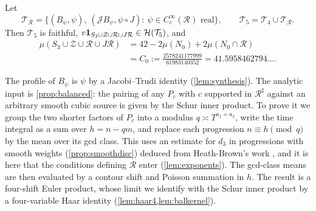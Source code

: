 \documentclass[11pt,colorlinks]{charlie}
\begin{document}
\begin{theorem}\label{thm:row}
Let
\[
 \mathcal T_{\mathcal R}=\big\{(B_\psi,\psi),\ (\mathcal JB_\psi,\psi\circ J):\ \psi\in C_c^\infty(\mathcal R)\text{ real}\big\},\qquad\mathcal T_5=\mathcal T_4\cup\mathcal T_{\mathcal R}.
\]
Then $\mathcal T_5$ is faithful, $v\mathbf{1}_{S_3\cup\mathcal Z\cup\mathcal R\cup J\mathcal R}\in\mathcal H(\mathcal T_5)$, and
\begin{align*}
 \mu(S_3\cup\mathcal Z\cup\mathcal R\cup J\mathcal R)&=42-2\mu(N_0)+2\mu(N_0\cap\mathcal R)\\
 &=C_0:=\frac{2578241177999}{61983140352}=41.5958462794\ldots .
\end{align*}
\end{theorem}

The profile of $B_\psi$ is $\psi$ by a Jacobi--Trudi identity (\cref{lem:synthesis}). The analytic input is \cref{prop:balanced}: the pairing of any $P_c$ with $c$ supported in $\mathcal R^\sharp$ against an arbitrary smooth cubic source is given by the Schur inner product. To prove it we group the two shorter factors of $P_c$ into a modulus $q\asymp T^{a_1+a_2}$, write the time integral as a sum over $h=n-qm$, and replace each progression $n\equiv h\pmod q$ by the mean over its gcd class. This uses an estimate for $d_3$ in progressions with smooth weights (\cref{prop:smoothdisc}) deduced from Heath-Brown's work \cite{HB}, and it is here that the conditions defining $\mathcal R$ enter (\cref{lem:exponents}). The gcd-class means are then evaluated by a contour shift and Poisson summation in $h$. The result is a four-shift Euler product, whose limit we identify with the Schur inner product by a four-variable Haar identity (\cref{lem:haar4,lem:balkernel}).
\end{document}
